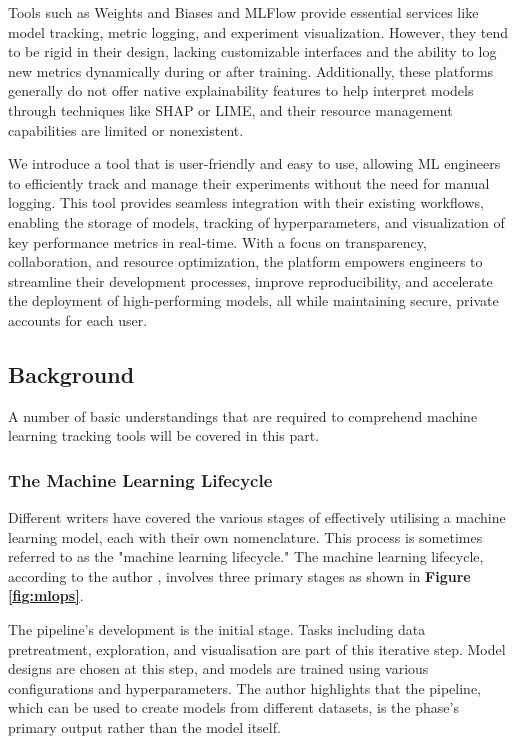 \documentclass[12pt]{article}
\begin{document}
Tools such as Weights and Biases and MLFlow provide essential services like model tracking, metric logging, and experiment visualization. However, they tend to be rigid in their design, lacking customizable interfaces and the ability to log new metrics dynamically during or after training\cite{derakhshan2019continuous}. Additionally, these platforms generally do not offer native explainability features to help interpret models through techniques like SHAP or LIME, and their resource management capabilities are limited or nonexistent. 

We introduce a tool that is user-friendly and easy to use, allowing ML engineers to efficiently track and manage their experiments without the need for manual logging. This tool provides seamless integration with their existing workflows, enabling the storage of models, tracking of hyperparameters, and visualization of key performance metrics in real-time. With a focus on transparency, collaboration, and resource optimization, the platform empowers engineers to streamline their development processes, improve reproducibility, and accelerate the deployment of high-performing models, all while maintaining secure, private accounts for each user.

\subsection{Background}
A number of basic understandings that are required to comprehend machine learning tracking tools will be covered in this part.

\subsubsection{The Machine Learning Lifecycle}
Different writers have covered the various stages of effectively utilising a machine learning model, each with their own nomenclature. This process is sometimes referred to as the "machine learning lifecycle." The machine learning lifecycle, according to the author \cite{garcia2018context}, involves three primary stages as shown in \textbf{Figure \ref{fig:mlops}}.

The pipeline's development is the initial stage. Tasks including data pretreatment, exploration, and visualisation are part of this iterative step. Model designs are chosen at this step, and models are trained using various configurations and hyperparameters. The author highlights that the pipeline, which can be used to create models from different datasets, is the phase's primary output rather than the model itself.
\end{document}
